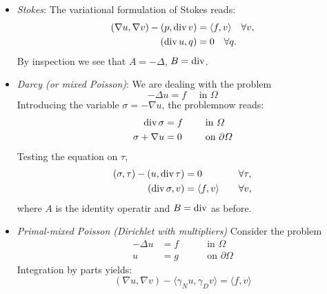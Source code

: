 \begin{itemize}
    \item \emph{Stokes}: The variational formulation of Stokes reads:
    \begin{equation}
        \begin{aligned}
            (\nabla u, \nabla v) - (p, \operatorname{\text{div}} v) &= \langle f, v \rangle \quad\forall v, \\
            (\operatorname{\text{div}} u, q) &= 0 \quad \forall q.
        \end{aligned}
    \end{equation}
    By inspection we see that $A=-\Delta$, $B=\operatorname{\text{div}}$.
    \item \emph{Darcy (or mixed Poisson)}: We are dealing with the problem
    \begin{equation}
        -\Delta u = f\quad \text{ in } \Omega
    \end{equation}
    Introducing the variable $\sigma = -\nabla u$, the problemnow reads:
    \begin{equation}
        \begin{aligned}
            \operatorname{\text{div}} \sigma &= f && \quad \text{ in } \Omega\\ 
            \sigma + \nabla u &= 0 && \quad \text{ on } \partial\Omega
        \end{aligned}
    \end{equation}
    Testing the equation on $\tau$,
    \begin{equation}
        \begin{aligned}
            (\sigma, \tau) - (u, \operatorname{\text{div}} \tau) &= 0
            &&\quad\forall \tau, \\ 
            (\operatorname{\text{div}} \sigma, v) &= \langle f,v \rangle
            &&\quad \forall v,
        \end{aligned}
    \end{equation}
    where $A$ is the identity operatir and $B=\operatorname{\text{div}}$ as before.
    \item \emph{Primal-mixed Poisson (Dirichlet with multipliers)}
    Consider the problem
    \begin{equation}
        \begin{aligned}
            -\Delta u &= f &&\quad\text{ in } \Omega \\ 
            u &= g &&\quad\text{ on } \partial\Omega
        \end{aligned}
    \end{equation}
    Integration by parts yields:
    \begin{equation}
        (\nabla u, \nabla v) - \langle \gamma_N u, \gamma_D v \rangle = \langle f,v \rangle

\end{equation}
\end{itemize}
